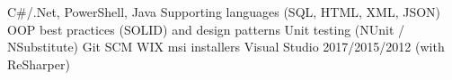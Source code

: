 C#/.Net, PowerShell, Java
Supporting languages (SQL, HTML, XML, JSON)
OOP best practices (SOLID) and design patterns
Unit testing (NUnit / NSubstitute)
Git SCM
WIX msi installers
Visual Studio 2017/2015/2012 (with ReSharper)